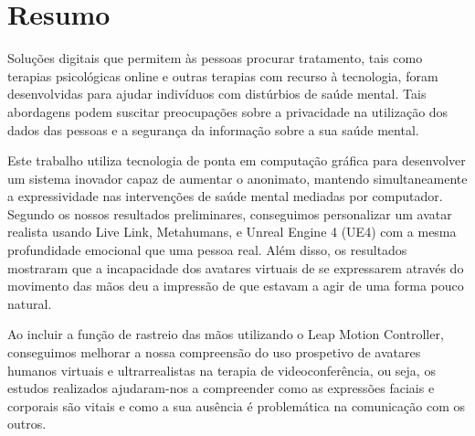 \chapter*{Resumo}
\justify
Soluções digitais que permitem às pessoas procurar tratamento, tais como terapias psicológicas online e outras terapias com recurso à tecnologia, foram desenvolvidas para ajudar indivíduos com distúrbios de saúde mental. Tais abordagens podem suscitar preocupações sobre a privacidade na utilização dos dados das pessoas e a segurança da informação sobre a sua saúde mental.

Este trabalho utiliza tecnologia de ponta em computação gráfica para desenvolver um sistema inovador capaz de aumentar o anonimato, mantendo simultaneamente a expressividade nas intervenções de saúde mental mediadas por computador. Segundo os nossos resultados preliminares, conseguimos personalizar um avatar realista usando Live Link, Metahumans, e Unreal Engine 4 (UE4) com a mesma profundidade emocional que uma pessoa real. Além disso, os resultados mostraram que a incapacidade dos avatares virtuais de se expressarem através do movimento das mãos deu a impressão de que estavam a agir de uma forma pouco natural.

Ao incluir a função de rastreio das mãos utilizando o Leap Motion Controller, conseguimos melhorar a nossa compreensão do uso prospetivo de avatares humanos virtuais e ultrarrealistas na terapia de videoconferência, ou seja, os estudos realizados ajudaram-nos a compreender como as expressões faciais e corporais são vitais e como a sua ausência é problemática na comunicação com os outros.

